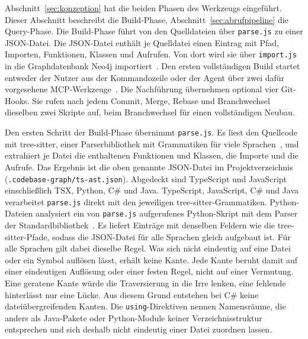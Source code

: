 Abschnitt~\ref{sec:konzeption} hat die beiden Phasen des Werkzeugs eingeführt. Dieser Abschnitt beschreibt die Build-Phase, Abschnitt~\ref{sec:abrufpipeline} die Query-Phase. Die Build-Phase führt von den Quelldateien über \texttt{parse.js} zu einer JSON-Datei. Die JSON-Datei enthält je Quelldatei einen Eintrag mit Pfad, Importen, Funktionen, Klassen und Aufrufen. Von dort wird sie über \texttt{import.js} in die Graphdatenbank Neo4j importiert~\parencite{neo4jdocs}. Den ersten vollständigen Build startet entweder der Nutzer aus der Kommandozeile oder der Agent über zwei dafür vorgesehene MCP-Werkzeuge~\parencite{anthropic2024mcp}. Die Nachführung übernehmen optional vier Git-Hooks. Sie rufen nach jedem Commit, Merge, Rebase und Branchwechsel dieselben zwei Skripte auf, beim Branchwechsel für einen vollständigen Neubau.

Den ersten Schritt der Build-Phase übernimmt \texttt{parse.js}. Es liest den Quellcode mit tree-sitter, einer Parserbibliothek mit Grammatiken für viele Sprachen~\parencite{treesitter}, und extrahiert je Datei die enthaltenen Funktionen und Klassen, die Importe und die Aufrufe. Das Ergebnis ist die oben genannte JSON-Datei im Projektverzeichnis (\texttt{.codebase-graph/ts-ast.json}). Abgedeckt sind TypeScript und JavaScript einschließlich TSX, Python, C\# und Java. TypeScript, JavaScript, C\# und Java verarbeitet \texttt{parse.js} direkt mit den jeweiligen tree-sitter-Grammatiken. Python-Dateien analysiert ein von \texttt{parse.js} aufgerufenes Python-Skript mit dem Parser der Standardbibliothek~\parencite{pythonast}. Es liefert Einträge mit denselben Feldern wie die tree-sitter-Pfade, sodass die JSON-Datei für alle Sprachen gleich aufgebaut ist. Für alle Sprachen gilt dabei dieselbe Regel. Was sich nicht eindeutig auf eine Datei oder ein Symbol auflösen lässt, erhält keine Kante. Jede Kante beruht damit auf einer eindeutigen Auflösung oder einer festen Regel, nicht auf einer Vermutung. Eine geratene Kante würde die Traversierung in die Irre lenken, eine fehlende hinterlässt nur eine Lücke. Aus diesem Grund entstehen bei C\# keine dateiübergreifenden Kanten. Die \texttt{using}-Direktiven nennen Namensräume, die anders als Java-Pakete oder Python-Module keiner Verzeichnisstruktur entsprechen und sich deshalb nicht eindeutig einer Datei zuordnen lassen.

